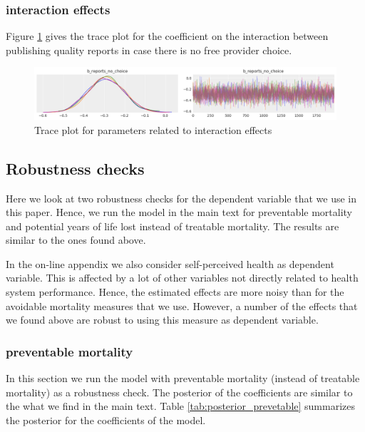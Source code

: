 \documentclass[a4paper,12pt]{article}
\begin{document}
\subsubsection{interaction effects}
\label{sec:org5d72e35}

Figure \ref{fig:trace_interaction} gives the trace plot for the coefficient on the interaction between publishing quality reports in case there is no free provider choice.

\begin{figure}[htbp]
\centering
\includegraphics[width=.9\linewidth]{./figures/trace_interaction.png}
\caption{\label{fig:trace_interaction}Trace plot for parameters related to interaction effects}
\end{figure}



\subsection{Robustness checks}
\label{sec:org9bbdae6}
\label{app:robustness}

Here we look at two robustness checks for the dependent variable that we use in this paper. Hence, we run the model in the main text for preventable mortality and potential years of life lost instead of treatable mortality. The results are similar to the ones found above.

In the on-line appendix we also consider self-perceived health as dependent variable. This is affected by a lot of other variables not directly related to health system performance. Hence, the estimated effects are more noisy than for the avoidable mortality measures that we use. However, a number  of the effects that we found above are robust to using this measure as dependent variable.

\subsubsection{preventable mortality}
\label{sec:org3e81d2b}

In this section we run the model with preventable mortality (instead of treatable mortality) as a robustness check. The posterior of the coefficients are similar to the what we find in the main text. Table \ref{tab:posterior_prevetable} summarizes the posterior for the coefficients of the model.
\end{document}
